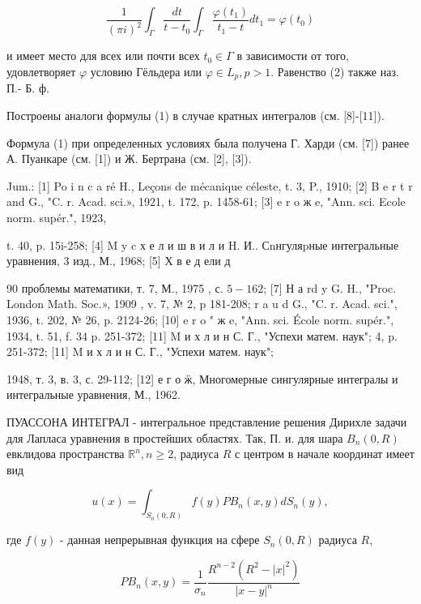 \documentclass[10pt]{article}
\begin{document}
\[

\frac{1}{(\pi i)^{2}} \int_{\Gamma} \frac{d t}{t-t_{0}} \int_{\Gamma} \frac{\varphi\left(t_{1}\right)}{t_{1}-t} d t_{1}=\varphi\left(t_{0}\right)

\]



и имеет место для всех или почти всех $t_{0} \in \Gamma$ в зависимости от того, удовлетворяет $\varphi$ условию Гёльдера или $\varphi \in L_{p}, p>1$. Равенство (2) также наз. П.- Б. ф.



Построены аналоги формулы (1) в случае кратных интегралов (см. [8]-[11]).



Формула (1) при определенных условиях была получена Г. Харди (см. [7]) ранее А. Пуанкаре (см. [1]) и Ж. Бертрана (см. [2], [3]).



Jum.: [1] Po i n c a ré H., Leçons de mécanique céleste, t. 3, P., 1910; [2] B e r t r and G., "C. r. Acad. sci.», 1921, t. 172, p. 1458-61; [3] e r o ж e, "Ann. sci. Ecole norm. supér.", 1923,

t. 40, p. 15i-258; [4] M y c х е л и ш в и л и H. И.. Сnнгуляpные интегральные уравнения, 3 изд., М., 1968; [5] Х в е д ели д

90 проблемы математики, т. 7, М., 1975 , с. $5-162$; [7] Н а rd y G. H., "Proc. London Math. Soc.», 1909 , v. 7, № 2, p 181-208; r a u d G., "C. r. Acad. sci.", 1936, t. 202, № 26, p. 2124-26; [10] e r o " ж e, "Ann. sci. École norm. supér.", 1934, t. 51, f. 34 p. 251-372; [11] M и х л и н С. Г., "Успехи матем. наук"; 4, p. 251-372; [11] M и х л и н С. Г., "Успехи матем. наук";

1948, т. 3, в. 3, с. 29-112; [12] е г о ӝ, Многомерные сингулярные интегралы и интегральные уравнения, М., 1962.



ПУАССОНА ИНТЕГРАЛ - интегральное представление решения Дирихле задачи для Лапласа уравнения в простейших областях. Так, П. и. для шара $B_{n}(0, R)$ евклидова пространства $\mathbb{R}^{n}, n \geqslant 2$, радиуса $R$ с центром в начале координат имеет вид



\[

u(x)=\int_{S_{n}(0, R)} f(y) P B_{n}(x, y) d S_{n}(y),

\]



где $f(y)$ - данная непрерывная функция на сфере $S_{n}(0, R)$ радиуса $R$,



\[

P B_{n}(x, y)=\frac{1}{\sigma_{n}} \frac{R^{n-2}\left(R^{2}-|x|^{2}\right)}{|x-y|^{n}}

\]
\end{document}
